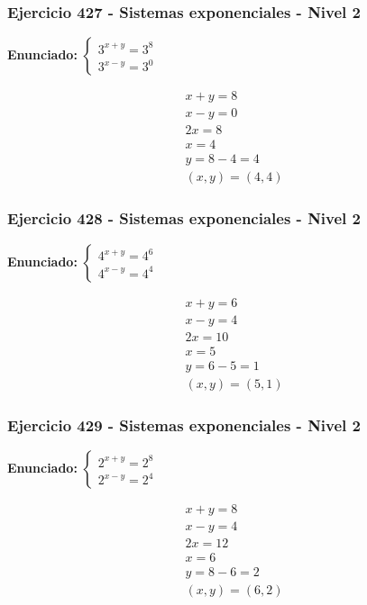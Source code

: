 \documentclass[12pt,a4paper]{article}
\begin{document}
\subsubsection*{Ejercicio 427 - Sistemas exponenciales - Nivel 2}
\textbf{Enunciado:} \(\begin{cases} 3^{x+y}=3^{8}\\ 3^{x-y}=3^{0}\end{cases}\)

\[
\begin{aligned}
x+y=8\\
x-y=0\\
2x=8\\
x=4\\
y=8-4=4\\
\boxed{(x,y)=(4,4)}
\end{aligned}
\]


\subsubsection*{Ejercicio 428 - Sistemas exponenciales - Nivel 2}
\textbf{Enunciado:} \(\begin{cases} 4^{x+y}=4^{6}\\ 4^{x-y}=4^{4}\end{cases}\)

\[
\begin{aligned}
x+y=6\\
x-y=4\\
2x=10\\
x=5\\
y=6-5=1\\
\boxed{(x,y)=(5,1)}
\end{aligned}
\]


\subsubsection*{Ejercicio 429 - Sistemas exponenciales - Nivel 2}
\textbf{Enunciado:} \(\begin{cases} 2^{x+y}=2^{8}\\ 2^{x-y}=2^{4}\end{cases}\)

\[
\begin{aligned}
x+y=8\\
x-y=4\\
2x=12\\
x=6\\
y=8-6=2\\
\boxed{(x,y)=(6,2)}
\end{aligned}
\]
\end{document}
